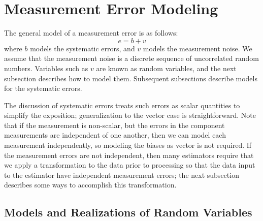 \section{Measurement Error Modeling}

The general model of a measurement error is as follows:
\begin{equation}
	e = b + v
\end{equation}
where $b$ models the systematic errors, and $v$ models the measurement noise.  We assume that the measurement noise is a discrete sequence of uncorrelated random numbers.  Variables such as $v$ are known as random variables, and the next subsection describes how to model them.  Subsequent subsections describe models for the systematic errors.

The discussion of systematic errors treats such errors as scalar quantities to simplify the exposition; generalization to the vector case is straightforward.  Note that if the measurement is non-scalar, but the errors in the component measurements are independent of one another, then we can model each measurement independently, so modeling the biases as vector is not required.  If the measurement errors are not independent, then many estimators require that we apply a transformation to the data prior to processing so that the data input to the estimator have independent measurement errors; the next subsection describes some ways to accomplish this transformation.

\subsection{Models and Realizations of Random Variables}

